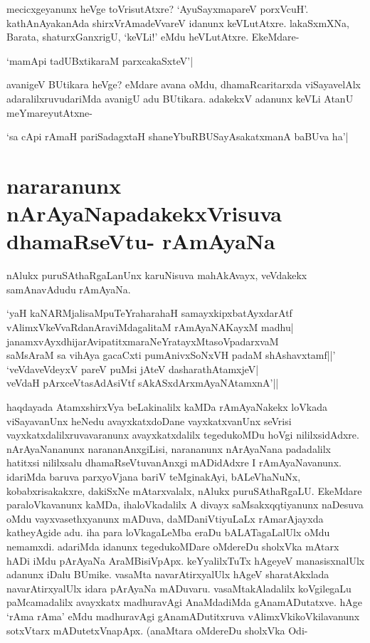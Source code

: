 mecicxgeyanunx heVge toVrisutAtxre? `AyuSayxmapareV porxVcuH'.\label{168g} kathAnAyakanAda shirxVrAmadeVvareV idanunx keVLutAtxre. lakaSxmXNa, Barata, shaturxGanxrigU, `keVLi!' eMdu heVLutAtxre. EkeMdare- 

\begin{shloka} 
`mamApi tadUBxtikaraM parxcakaSxteV'|\label{168b}
\end{shloka} 

avanigeV BUtikara heVge? eMdare avana oMdu, dhamaRcaritarxda viSayavelAlx adaralilxruvudariMda avanigU adu BUtikara. adakekxV adanunx keVLi AtanU meYmareyutAtxne- 

\begin{shloka} 
`sa cApi rAmaH pariSadagxtaH shaneYbuRBUSayAsakatxmanA baBUva ha'|\label{168cc}
\end{shloka} 

\section*{nararanunx nArAyaNapadakekxVrisuva dhamaRseVtu- rAmAyaNa} 

nAlukx puruSAthaRgaLanUnx karuNisuva mahAkAvayx, veVdakekx samAnavAdudu rAmAyaNa. 

\begin{shloka} 
`yaH kaNARMjalisaMpuTeYraharahaH samayxkipxbatAyxdarAtf\label{168a}\\ 
vAlimxVkeVvaRdanAraviMdagalitaM rAmAyaNAKayxM madhu|\\ 
janamxvAyxdhijarAvipatitxmaraNeYratayxMtasoVpadarxvaM\\ 
saMsAraM sa vihAya gacaCxti pumAnivxSoNxVH padaM shAshavxtamf||'\\ 
`veVdaveVdeyxV pareV puMsi jAteV dasharathAtamxjeV|\label{168c}\\ 
veVdaH pArxceVtasAdAsiVtf sAkASxdArxmAyaNAtamxnA'||
\end{shloka} 

haqdayada AtamxshirxVya beLakinalilx kaMDa rAmAyaNakekx loVkada viSayavanUnx heNedu avayxkatxdoDane vayxkatxvanUnx seVrisi vayxkatxdalilxruvavaranunx avayxkatxdalilx tegedukoMDu hoVgi nililxsidAdxre. nArAyaNananunx narananAnxgiLisi, narananunx nArAyaNana padadalilx hatitxsi nililxsalu dhamaRseVtuvanAnxgi mADidAdxre I rAmAyaNavanunx. idariMda baruva parxyoVjana bariV teMginakAyi, bALeVhaNuNx, kobabxrisakakxre, dakiSxNe mAtarxvalalx, nAlukx puruSAthaRgaLU. EkeMdare paraloVkavanunx kaMDa, ihaloVkadalilx A divayx saMsakxqqtiyanunx naDesuva oMdu vayxvasethxyanunx mADuva, daMDaniVtiyuLaLx rAmarAjayxda katheyAgide adu. iha para loVkagaLeMba eraDu bALATagaLalUlx oMdu nemamxdi. adariMda idanunx tegedukoMDare oMdereDu sholxVka mAtarx hADi iMdu pArAyaNa AraMBisiVpApx. keYyalilxTuTx hAgeyeV manasisxnalUlx adanunx iDalu BUmike. vasaMta navarAtirxyalUlx hAgeV sharatAkxlada navarAtirxyalUlx idara pArAyaNa mADuvaru. vasaMtakAladalilx koVgilegaLu paMcamadalilx avayxkatx madhuravAgi AnaMdadiMda gAnamADutatxve. hAge `rAma rAma' eMdu madhuravAgi gAnamADutitxruva vAlimxVkikoVkilavanunx sotxVtarx mADutetxVnapApx. (anaMtara oMdereDu sholxVka Odi- 

